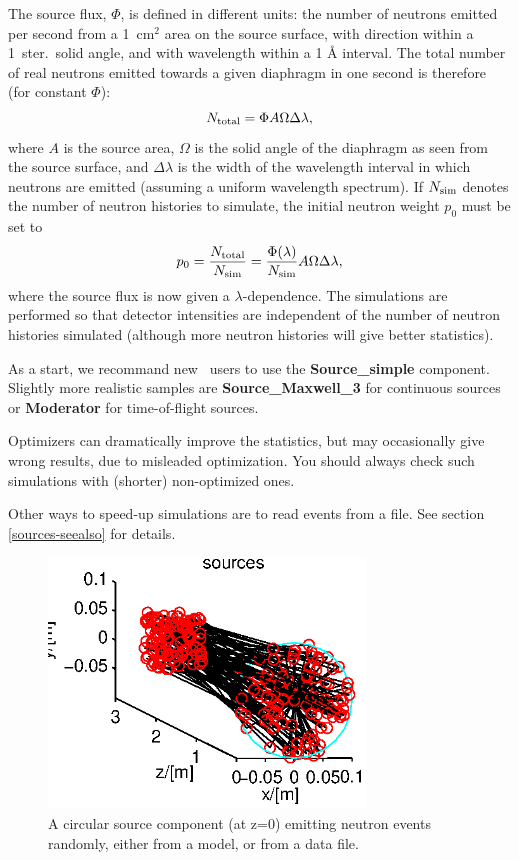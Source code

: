 The source flux, $\Phi$, is defined in different units:
the number of neutrons emitted per second from a
1~cm$^2$ area on the source surface, 
with direction within a 1~ster.\ solid angle, 
and with wavelength within a 1 {\AA} interval. 
The total number of real neutrons emitted towards a given diaphragm
in one second is therefore (for constant $\Phi$):
\begin{equation} 
N_{\rm total} = \Phi A \Omega \Delta\lambda ,
\end{equation}
where $A$ is the source area, $\Omega$ is the solid angle of the
diaphragm as seen from the source surface, and $\Delta\lambda$ is the
width of the wavelength interval in which neutrons are emitted (assuming
a uniform wavelength spectrum). If $N_{\rm sim}$ denotes the number of
neutron histories to simulate, the initial neutron weight $p_0$ must be set to
\begin{equation}
p_0 = \frac{N_{\rm total}}{N_{\rm sim}} =
    \frac{\Phi(\lambda)}{N_{\rm sim}} A \Omega \Delta\lambda ,
\end{equation}
where the source flux is now given a $\lambda$-dependence.
The simulations are performed so that detector intensities
are independent of the number of neutron histories simulated
(although more neutron histories will give better statistics).

As a start, we recommand new \MCS\ users to use the 
{\bf Source\_simple} component.
Slightly more realistic samples are {\bf Source\_Maxwell\_3} for
continuous sources or {\bf Moderator} for time-of-flight sources.

Optimizers can dramatically improve the statistics, but may occasionally 
give wrong results, due to misleaded optimization. 
You should always check such simulations with (shorter) non-optimized ones.

Other ways to speed-up simulations are to read events from a file. 
See section \ref{sources-seealso} for details.

\begin{figure}
  \begin{center}
    \includegraphics[width=0.75\textwidth]{figures/sources.eps}
  \end{center}
\caption{A circular source component (at z=0) emitting neutron events randomly, either from a model, or from a data file.}
\label{f:source}
\end{figure}

